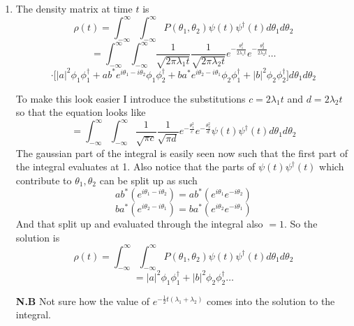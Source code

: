 \documentclass[12pt]{article}
\begin{document}
\begin{enumerate}
    \item The density matrix at time $t$ is 
    $$ \rho (t) = \int_{- \infty}^{\infty} \int_{- \infty}^{\infty}  P(\theta_1, \theta_2) \psi (t) \psi^{\dagger} (t) d \theta_1 d \theta_2 $$
    $$ = \int_{- \infty}^{\infty} \int_{- \infty}^{\infty}  \frac{1}{\sqrt{2 \pi \lambda_1 t}} \frac{1}{\sqrt{2 \pi \lambda_2 t}} e^{- \frac{\theta_1^2}{2 \lambda_1 t}}e^{- \frac{\theta_2^2}{2 \lambda_2 t}} \ldots $$
    $$ \cdot \Big[ |a|^2 \phi_1 \phi_1^{\dagger} + ab^* e^{i \theta_1 - i\theta_2} \phi_1 \phi_2^{\dagger} + ba^* e^{i \theta_2 - i \theta_1} \phi_2 \phi_1^{\dagger} + |b|^2 \phi_2 \phi_2^{\dagger}  \Big] d \theta_1 d \theta_2 $$

    To make this look easier I introduce the substitutions $c = 2 \lambda_1 t$ and $d = 2 \lambda_2 t$ so that the equation looks like 
    $$ = \int_{- \infty}^{\infty} \int_{- \infty}^{\infty}  \frac{1}{\sqrt{ \pi c}} \frac{1}{\sqrt{ \pi d}} e^{- \frac{\theta_1^2}{ c}}e^{- \frac{\theta_2^2}{d}} \psi (t) \psi^{\dagger} (t) d \theta_1 d \theta_2 $$
    The gaussian part  of the integral is easily seen now such that the first part of the integral evaluates at 1. Also notice that the parts of $\psi (t) \psi^{\dagger} (t)$ which contribute to $\theta_1, \theta_2$ can be split up as such
    $$ a b^* (e^{i \theta_1 - i\theta_2}) = a b^* (e^{i \theta_1 }e^{- i\theta_2}) $$
    $$  ba^* (e^{i \theta_2 - i \theta_1}) = ba^* (e^{i \theta_2} e^{ - i \theta_1}) $$
    And that split up and evaluated through the integral also $=1$. So the solution is 
    $$ \rho (t) = \int_{- \infty}^{\infty} \int_{- \infty}^{\infty} P(\theta_1, \theta_2) \psi (t) \psi^{\dagger} (t) d \theta_1 d \theta_2 $$
    $$ = |a|^2 \phi_1 \phi_1^{\dagger} + |b|^2 \phi_2 \phi_2^{\dagger} \ldots $$

    \textbf{N.B} Not sure how the value of $e^{-\frac{1}{2} t(\lambda_1 + \lambda_2)}$ comes into the solution to the integral. 


\end{enumerate}
\end{document}

